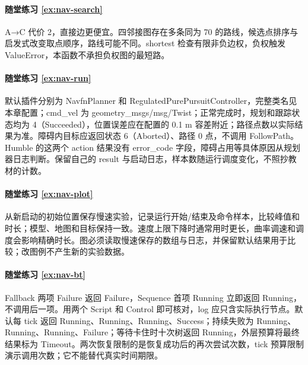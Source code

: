 \paragraph*{随堂练习 \ref{ex:nav-search}}
\begin{solution}
A→C 代价 2，直接边更便宜。四邻接图存在多条同为 70 的路线，候选点排序与启发式改变取点顺序，路线可能不同。shortest 检查有限非负边权，负权触发 ValueError，本函数不承担负权图的最短路。
\end{solution}

\paragraph*{随堂练习 \ref{ex:nav-run}}
\begin{solution}
默认插件分别为 NavfnPlanner 和 RegulatedPurePursuitController，完整类名见本章配置；cmd\_vel 为 geometry\_msgs/msg/Twist；正常完成时，规划和跟踪状态均为 4（Succeeded），位置误差应在配置的 0.1 m 容差附近；路径点数以实际结果为准。障碍内目标应返回状态 6（Aborted）、路径 0 点，不调用 FollowPath。Humble 的这两个 action 结果没有 error\_code 字段，障碍占用等具体原因从规划器日志判断。保留自己的 result 与启动日志，样本数随运行调度变化，不照抄教材的计数。
\end{solution}

\paragraph*{随堂练习 \ref{ex:nav-plot}}
\begin{solution}
从新启动的初始位置保存慢速实验，记录运行开始/结束及命令样本，比较峰值和时长；模型、地图和目标保持一致。速度上限下降时通常用时更长，曲率调速和调度会影响精确时长。图必须读取慢速保存的数组与日志，并保留默认结果用于比较；改图例不产生新的实验数据。
\end{solution}

\paragraph*{随堂练习 \ref{ex:nav-bt}}
\begin{solution}
Fallback 两项 Failure 返回 Failure，Sequence 首项 Running 立即返回 Running，不调用后一项。用两个 Script 和 Control 即可核对，log 应只含实际执行节点。默认每 tick 返回 Running、Running、Running、Success；持续失败为 Running、Running、Running、Failure；等待卡住时十次树返回 Running，外层预算将最终结果标为 Timeout。两次恢复限制的是恢复成功后的再次尝试次数，tick 预算限制演示调用次数；它不能替代真实时间期限。
\end{solution}
